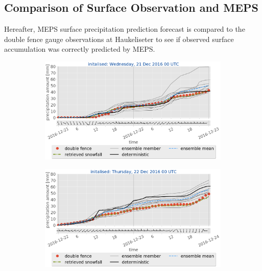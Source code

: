\subsection{Comparison of Surface Observation and MEPS}\label{sec:sfc_acc}
Hereafter, MEPS surface precipitation prediction forecast is compared to the double fence gauge observations at Haukeliseter to see if observed surface accumulation was correctly predicted by MEPS.
\begin{figure}[H]
	\centering
	\begin{subfigure}[t]{0.97\textwidth}		\includegraphics[trim={0.cm 5.2cm 0.cm 0cm},clip,width=\textwidth]{./fig_sfc_acc/acc_wind_20161221_00}
		\caption{}\label{fig:sfc_acc21}
	\end{subfigure}
	\begin{subfigure}[t]{0.97\textwidth}		\includegraphics[trim={0.cm 5.2cm 0.cm 0cm},clip,width=\textwidth]{./fig_sfc_acc/acc_wind_20161222_00}
		\caption{}\label{fig:sfc_acc22}
	\end{subfigure}

\end{figure}
